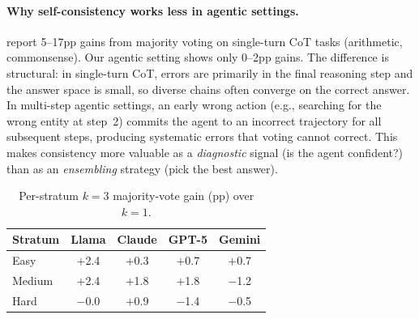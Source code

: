 \documentclass{article}
\begin{document}
\paragraph{Why self-consistency works less in agentic settings.} \citet{wang2022self} report 5--17pp gains from majority voting on single-turn CoT tasks (arithmetic, commonsense). Our agentic setting shows only 0--2pp gains. The difference is structural: in single-turn CoT, errors are primarily in the final reasoning step and the answer space is small, so diverse chains often converge on the correct answer. In multi-step agentic settings, an early wrong action (e.g., searching for the wrong entity at step~2) commits the agent to an incorrect trajectory for all subsequent steps, producing systematic errors that voting cannot correct. This makes consistency more valuable as a \emph{diagnostic} signal (is the agent confident?) than as an \emph{ensembling} strategy (pick the best answer).

\begin{table}[h]
\centering
\small
\caption{Per-stratum $k\!=\!3$ majority-vote gain (pp) over $k\!=\!1$.}
\label{tab:stratum_vote}
\scriptsize
\begin{tabular}{lcccc}
\toprule
\textbf{Stratum} & \textbf{Llama} & \textbf{Claude} & \textbf{GPT-5} & \textbf{Gemini} \\
\midrule
Easy & $+$2.4 & $+$0.3 & $+$0.7 & $+$0.7 \\
Medium & $+$2.4 & $+$1.8 & $+$1.8 & $-$1.2 \\
Hard & $-$0.0 & $+$0.9 & $-$1.4 & $-$0.5 \\
\bottomrule
\end{tabular}
\end{table}
\end{document}
